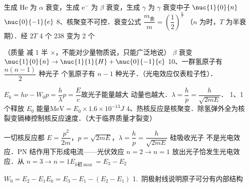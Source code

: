 生成 He 为 $\alpha$ 衰变，生成 $\mathrm{e}^-$ 为 $\beta$ 衰变，生成 $\gamma$ 为 $\gamma$ 衰变\quad 中子 $\nuc{1}{0}{n}$\quad $\nuc{0}{-1}{e}$
8、核聚变不可控．\quad 衰变公式 $\dfrac{m_{\text{余}}}{m}=\left(\dfrac12\right)^{\frac nT}$%
\quad（$n$ 为时，$T$ 为半衰期）．经 $2T$ 4 个 238 变为 2 个%

\quad {}

（质量  减 1 半 $\times$，不能对少量物质说，只能广泛地说）
$\beta$ 衰变\quad $\nuc{1}{0}{n}\to\nuc{1}{1}{H}+\nuc{0}{-1}{e}$
10、一群氢原子有 $\dfrac{n(n-1)}{2}$ 种光子 个氢原子有 $n-1$ 种光子．（光电效应仅表粒子性）．

$E_k=h\nu-W_0$\quad $p=\dfrac h\lambda$\quad $p=\dfrac Ec$\quad 故光子能量越大 动量也越大．\quad $\lambda=\dfrac hp=\dfrac{h}{\sqrt{2mE}}$．
1、1个释放 $E_0$ 能量\quad $\mathrm{MeV}=E_0\times1.6\times10^{-13}\unit{J}$
4、热核反应是核聚变．除氢弹外全为核裂变\quad 镉棒控制核反应速度．（大于临界质量才裂变）

一切核反应都\quad {}
$E=\dfrac{p^2}{2m}$，\quad $p=\sqrt{2mE}$，\quad $\lambda=\dfrac hp=\dfrac{h}{\sqrt{2mE}}$
硅吸收光子 不是光电效应．PN 结作用下形成电流——光伏效应%
$n=2\to n=1$ 放出光子恰发生光电效应．从 $n=3\to n=1$\quad $E_{k\text{初}\max}=E_3-E_2$

$W_0=E_2-E_1$\quad\quad $E_k=E_3-E_1-(E_2-E_1)$
1.\ 阴极射线说明原子可分有内部结构

